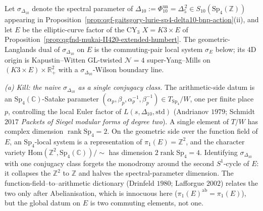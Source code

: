 \begin{proposition}[Dual geometric Langlands for \texorpdfstring{$\sigma_{\Delta_{10}}$}{sigma-Delta-10}: \texorpdfstring{$\pi_1(E)=\mathbb Z^2\to\mathrm{Sp}_4(\mathbb C)$}{pi-1(E)=Z-2->Sp-4(C)} as a commuting pair, and the Kapustin--Witten \texorpdfstring{$4$}{4}D origin of the \texorpdfstring{$\Eone$}{E1}-chiral boundary]
\label{prop:qgfnd-dual-langlands-sigma-delta10-pi1E-sp4-commuting-KW}
Let $\sigma_{\Delta_{10}}$ denote the spectral parameter of
$\Delta_{10}:=\Phi_{10}^{\mathrm{un}}=\Delta_5^{\,2}\in S_{10}(\mathrm{Sp}_4(\mathbb Z))$
appearing in
Proposition~\ref{prop:qgf-gaitsgory-lurie-sp4-delta10-bnp-action}(ii),
and let $E$ be the elliptic-curve factor of the CY$_3$
$X=K3\times E$ of
Proposition~\ref{prop:qgfnd-mukai-II420-extended-humbert}. The
geometric-Langlands dual of $\sigma_{\Delta_{10}}$ on $E$ is the
commuting-pair local system $\sigma_E$ below; its $4$D origin is
Kapustin--Witten GL-twisted $\mathcal N=4$ super-Yang--Mills on
$(K3\times E)\times\mathbb R_+^2$ with a
$\sigma_{\Delta_{10}}$-Wilson boundary line.

\emph{(a) Kill: the naive $\sigma_{\Delta_{10}}$ as a single conjugacy
class.} The arithmetic-side datum is an $\mathrm{Sp}_4(\mathbb C)$-Satake
parameter
$(\alpha_p,\beta_p,\alpha_p^{-1},\beta_p^{-1})\in T_{\mathrm{Sp}_4}/W$,
one per finite place $p$, controlling the local Euler factor of
$L(s,\Delta_{10},\mathrm{std})$ (Andrianov $1979$; Schmidt $2017$
\emph{Packets of Siegel modular forms of degree two}). A single
element of $T/W$ has complex dimension
$\operatorname{rank}\mathrm{Sp}_4=2$. On the geometric side over
the function field of $E$, an $\mathrm{Sp}_4$-local system is a
representation of $\pi_1(E)=\mathbb Z^2$, and the character variety
$\mathrm{Hom}(\mathbb Z^2,\mathrm{Sp}_4(\mathbb C))/\!\!\sim$ has
dimension
$2\operatorname{rank}\mathrm{Sp}_4=4$. Identifying
$\sigma_{\Delta_{10}}$ with one conjugacy class forgets the monodromy
around the second $S^1$-cycle of $E$: it collapses the $\mathbb Z^2$
to $\mathbb Z$ and halves the spectral-parameter dimension. The
function-field--to--arithmetic dictionary (Drinfeld $1980$;
Lafforgue $2002$) relates the two only after Abelianisation, which is
innocuous here ($\pi_1(E)^{\mathrm{ab}}=\pi_1(E)$), but the global
datum on $E$ is two commuting elements, not one.


\end{proposition}
